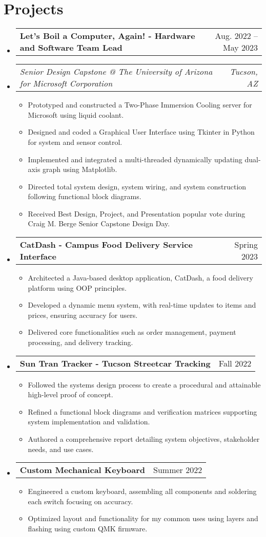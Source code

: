 \documentclass[letterpaper,11pt]{article}
\makeatletter
\newcommand{\resumeItem}[1]{
  \item\small{
    {#1 \vspace{-2pt}}
  }
}
\newcommand{\resumeSubSubheading}[2]{
    \item
    \begin{tabular*}{0.97\textwidth}{l@{\extracolsep{\fill}}r}
      \textit{\small#1} & \textit{\small #2} \\
    \end{tabular*}\vspace{-7pt}
}
\newcommand{\resumeProjectHeading}[2]{
    \item
    \begin{tabular*}{0.97\textwidth}{l@{\extracolsep{\fill}}r}
      \small#1 & #2 \\
    \end{tabular*}\vspace{-7pt}
}
\newcommand{\resumeSubHeadingListStart}{\begin{itemize}[leftmargin=0.15in, label={}]}
\newcommand{\resumeSubHeadingListEnd}{\end{itemize}}
\newcommand{\resumeItemListStart}{\begin{itemize}}
\newcommand{\resumeItemListEnd}{\end{itemize}\vspace{-5pt}}
\makeatother
\begin{document}
\section{Projects}
    \resumeSubHeadingListStart
      \resumeProjectHeading
          {\textbf{Let's Boil a Computer, Again! - Hardware and Software Team Lead} }{Aug. 2022 -- May 2023}
          \resumeSubSubheading{Senior Design Capstone @ The University of Arizona for Microsoft Corporation}{Tucson, AZ}
          \resumeItemListStart
            \resumeItem{Prototyped and constructed a Two-Phase Immersion Cooling server for Microsoft using liquid coolant.}
            \resumeItem{Designed and coded a Graphical User Interface using Tkinter in Python for system and sensor control.}
            \resumeItem{Implemented and integrated a multi-threaded dynamically updating dual-axis graph using Matplotlib.}
            \resumeItem{Directed total system design, system wiring, and system construction following functional block diagrams.}
            \resumeItem{Received Best Design, Project, and Presentation popular vote during Craig M. Berge Senior Capstone Design Day.}
          \resumeItemListEnd
      \resumeProjectHeading
          {\textbf{CatDash - Campus Food Delivery Service Interface} }{Spring 2023}{}
          \resumeItemListStart
            \resumeItem{Architected a Java-based desktop application, CatDash, a food delivery platform using OOP principles.}
            \resumeItem{Developed a dynamic menu system, with real-time updates to items and prices, ensuring accuracy for users.}
            \resumeItem{Delivered core functionalities such as order management, payment processing, and delivery tracking.}
          \resumeItemListEnd
      \resumeProjectHeading
          {\textbf{Sun Tran Tracker - Tucson Streetcar Tracking} }{Fall 2022}{}
          \resumeItemListStart
            \resumeItem{Followed the systems design process to create a procedural and attainable high-level proof of concept.}
            \resumeItem{Refined a functional block diagrams and verification matrices supporting system implementation and validation.}
            \resumeItem{Authored a comprehensive report detailing system objectives, stakeholder needs, and use cases.}
          \resumeItemListEnd
      \resumeProjectHeading
          {\textbf{Custom Mechanical Keyboard} }{Summer 2022}{}
          \resumeItemListStart
            \resumeItem{Engineered a custom keyboard, assembling all components and soldering each switch focusing on accuracy.}
            \resumeItem{Optimized layout and functionality for my common uses using layers and flashing using custom QMK firmware.}
          \resumeItemListEnd
    \resumeSubHeadingListEnd
\end{document}
